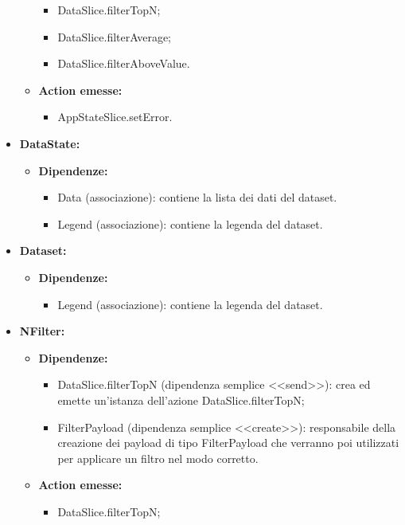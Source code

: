 \begin{itemize}
\begin{itemize}
        \begin{itemize}
            \item DataSlice.filterTopN;
            \item DataSlice.filterAverage;
            \item DataSlice.filterAboveValue.
        \end{itemize} 
        \item \textbf{Action emesse:}
        \begin{itemize}
            \item AppStateSlice.setError.
        \end{itemize} 
    \end{itemize}

    \item \textbf{DataState:}
    \begin{itemize}
        \item \textbf{Dipendenze:}
        \begin{itemize}
            \item Data (associazione): contiene la lista dei dati del dataset.
            \item Legend (associazione): contiene la legenda del dataset.
        \end{itemize} 
    \end{itemize}

    \item \textbf{Dataset:}
    \begin{itemize}
        \item \textbf{Dipendenze:}
        \begin{itemize}
            \item Legend (associazione): contiene la legenda del dataset.
        \end{itemize} 
    \end{itemize}

    \item \textbf{NFilter:}
    \begin{itemize}
        \item \textbf{Dipendenze:}
        \begin{itemize}
            \item DataSlice.filterTopN (dipendenza semplice <<send>>): crea ed emette un’istanza dell’azione DataSlice.filterTopN;
            \item FilterPayload (dipendenza semplice <<create>>): responsabile della creazione dei payload di tipo FilterPayload che verranno poi utilizzati per applicare un filtro nel modo corretto.
        \end{itemize} 
        \item \textbf{Action emesse:}
        \begin{itemize}
            \item DataSlice.filterTopN;
        \end{itemize} 
    \end{itemize}


\end{itemize}
